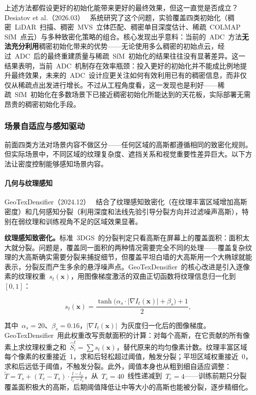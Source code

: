 上述方法都假设更好的初始化能带来更好的最终效果，但这一直觉是否成立？Desiatov et al.（2026.03）~\cite{2603_20714} 系统研究了这个问题，实验覆盖四类初始化（稠密~LiDAR~扫描、稠密~MVS~立体匹配、稠密单目深度估计、稀疏~COLMAP SfM~点云）与多种致密化策略的组合。核心发现出乎意料：当前的~ADC~方法\textbf{无法充分利用}稠密初始化带来的优势——无论使用多么稠密的初始点云，经过~ADC~后的最终重建质量与稀疏~SfM~初始化的结果往往没有显著差异。这一结果表明，当前~ADC~机制存在效率瓶颈：投入更好的初始化并不能成比例地提升最终效果，未来的~ADC~设计应更关注如何有效利用已有的稠密信息，而非仅仅从稀疏点出发进行增长。不过从工程角度看，这一发现也是利好——稀疏~SfM~初始化在多数场景下已接近稠密初始化所能达到的天花板，实际部署无需昂贵的稠密初始化手段。

\subsubsection{场景自适应与感知驱动}

前面四类方法对场景内容不做区分——任何区域的高斯都遵循相同的致密化规则。但实际场景中，不同区域的纹理复杂度、遮挡关系和视觉重要性差异巨大。以下方法让密度控制能够感知场景内容。

\paragraph{几何与纹理感知}

GeoTexDensifier（2024.12）~\cite{2412_16809} 结合了纹理感知致密化（在纹理丰富区域增加高斯密度）和几何感知分裂（利用深度和法线先验引导分裂方向并过滤噪声高斯），特别在弱纹理和训练视角不足的区域效果显著。

\textbf{纹理感知致密化。}标准~3DGS~的分裂判定只看高斯在屏幕上的覆盖面积：面积太大就分裂。问题是，覆盖同一面积的两种情况需要完全不同的处理——覆盖复杂纹理的大高斯确实需要分裂来捕捉细节，但覆盖平坦白墙的大高斯用一个大椭球就能表示，分裂反而产生多余的悬浮噪声点。GeoTexDensifier~的核心改进是引入逐像素的纹理权重~$s_t(\mathbf{x})$，用图像梯度激活的双曲正切函数将纹理信息归一化到~$[0,1]$：

\begin{equation*}
s_t(\mathbf{x}) = \frac{\tanh\bigl(\alpha_s \cdot |\nabla I_t(\mathbf{x})| + \beta_s\bigr) + 1}{2},
\end{equation*}

其中~$\alpha_s=20$、$\beta_s=0.16$，$|\nabla I_t(\mathbf{x})|$~为灰度归一化后的图像梯度。GeoTexDensifier~用此权重改写贡献面积的计算：对每个高斯，在它贡献的所有像素上求纹理权重之和~$\hat{S}_i^t = \sum s_t(\mathbf{x})$，替代原来的均匀像素计数。纹理丰富区域每个像素的权重接近~1，求和后轻松超过阈值，触发分裂；平坦区域权重接近~0，求和后远低于阈值，不触发分裂。此外，阈值本身也从粗到细自适应调整：~$\tilde{T} = T_s + (T_e - T_s) \cdot \frac{l - l_s}{l_e - l_s}$，从~$T_s=40$~线性递减到~$T_e=4$——训练前期只分裂覆盖面积极大的高斯，后期阈值降低让中等大小的高斯也能被分裂，逐步精细化。

